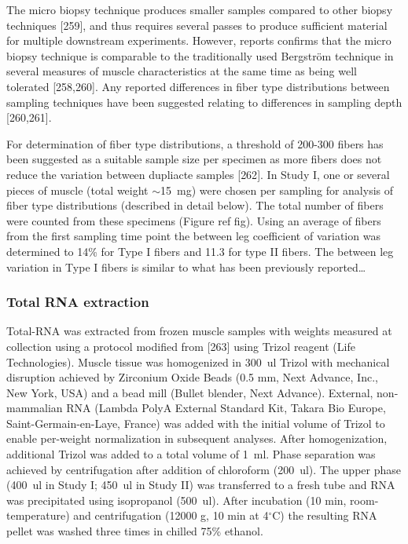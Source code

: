 \documentclass[twoside,10pt]{gihclass} %
\begin{document}
The micro biopsy technique produces smaller samples compared to other
biopsy techniques
{[}259{]}, and thus
requires several passes to produce sufficient material for multiple
downstream experiments. However, reports confirms that the micro biopsy
technique is comparable to the traditionally used Bergström technique in
several measures of muscle characteristics at the same time as being
well tolerated {[}258,260{]}. Any reported differences in fiber type
distributions between sampling techniques have been suggested relating
to differences in sampling depth {[}260,261{]}.

For determination of fiber type distributions, a threshold of 200-300
fibers has been suggested as a suitable sample size per specimen as more
fibers does not reduce the variation between dupliacte samples
{[}262{]}.
In Study I, one or several pieces of muscle (total weight
\(\sim\)\SI{15}{mg}) were chosen per sampling for analysis of fiber type
distributions (described in detail below). The total number of fibers
were counted from these specimens (Figure ref fig). Using an average of
fibers from the first sampling time point the between leg coefficient of
variation was determined to 14\% for Type I fibers and 11.3 for type II
fibers. The between leg variation in Type I fibers is similar to what
has been previously reported\ldots{}

\hypertarget{total-rna-extraction}{%
\subsubsection{Total RNA extraction}\label{total-rna-extraction}}

Total-RNA was extracted from frozen muscle samples with weights measured at collection using a protocol modified from
{[}263{]}
using Trizol reagent (Life Technologies).
Muscle tissue was homogenized in \SI{300}{ul} Trizol with mechanical disruption achieved by Zirconium Oxide Beads (0.5 mm, Next Advance, Inc., New York, USA) and a bead mill (Bullet blender, Next Advance). External, non-mammalian RNA (Lambda PolyA External Standard Kit, Takara Bio Europe, Saint-Germain-en-Laye, France) was added with the initial volume of Trizol to enable per-weight normalization in subsequent analyses. After homogenization, additional Trizol was added to a total volume of \SI{1}{ml}. Phase separation was achieved by centrifugation after addition of chloroform (\SI{200}{ul}). The upper phase (\SI{400}{ul} in Study I; \SI{450}{ul} in Study II) was transferred to a fresh tube and RNA was precipitated using isopropanol (\SI{500}{ul}). After incubation (10 min, room-temperature) and centrifugation (12000 g, 10 min at 4\(^{\circ}\)C) the resulting RNA pellet was washed three times in chilled 75\% ethanol.
\end{document}
